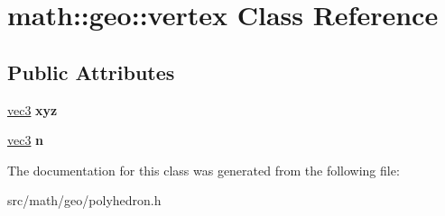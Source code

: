 \hypertarget{classmath_1_1geo_1_1vertex}{
\section{math::geo::vertex Class Reference}
\label{classmath_1_1geo_1_1vertex}
}
\subsection*{Public Attributes}
\begin{DoxyCompactItemize}
\item 
\hypertarget{classmath_1_1geo_1_1vertex_af97a82d975dc13d8928ea166b1237c59}{
\hyperlink{classmath_1_1vec3}{vec3} {\bfseries xyz}}
\label{classmath_1_1geo_1_1vertex_af97a82d975dc13d8928ea166b1237c59}

\item 
\hypertarget{classmath_1_1geo_1_1vertex_aabe2303a4d7dee1177bc4f181cb4b9a5}{
\hyperlink{classmath_1_1vec3}{vec3} {\bfseries n}}
\label{classmath_1_1geo_1_1vertex_aabe2303a4d7dee1177bc4f181cb4b9a5}

\end{DoxyCompactItemize}


The documentation for this class was generated from the following file:\begin{DoxyCompactItemize}
\item 
src/math/geo/polyhedron.h\end{DoxyCompactItemize}
